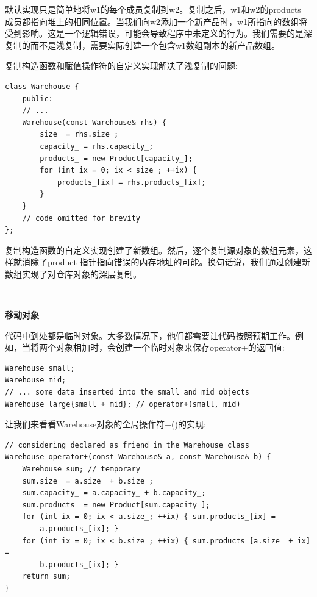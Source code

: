 默认实现只是简单地将w1的每个成员复制到w2。复制之后，w1和w2的products\underline{ }成员都指向堆上的相同位置。当我们向w2添加一个新产品时，w1所指向的数组将受到影响。这是一个逻辑错误，可能会导致程序中未定义的行为。我们需要的是深复制的而不是浅复制，需要实际创建一个包含w1数组副本的新产品数组。 \par
复制构造函数和赋值操作符的自定义实现解决了浅复制的问题: \par

\begin{lstlisting}[caption={}]
class Warehouse {
	public:
	// ...
	Warehouse(const Warehouse& rhs) {
		size_ = rhs.size_;
		capacity_ = rhs.capacity_;
		products_ = new Product[capacity_];
		for (int ix = 0; ix < size_; ++ix) {
			products_[ix] = rhs.products_[ix];
		}
	}
	// code omitted for brevity
};
\end{lstlisting}

复制构造函数的自定义实现创建了新数组。然后，逐个复制源对象的数组元素，这样就消除了product\underline{ }指针指向错误的内存地址的可能。换句话说，我们通过创建新数组实现了对仓库对象的深层复制。 \par

\noindent\textbf{}\ \par
\textbf{移动对象} \ \par
代码中到处都是临时对象。大多数情况下，他们都需要让代码按照预期工作。例如，当将两个对象相加时，会创建一个临时对象来保存operator+的返回值: \par

\begin{lstlisting}[caption={}]
Warehouse small;
Warehouse mid;
// ... some data inserted into the small and mid objects
Warehouse large{small + mid}; // operator+(small, mid)
\end{lstlisting}

让我们来看看Warehouse对象的全局操作符+()的实现: \par

\begin{lstlisting}[caption={}]
// considering declared as friend in the Warehouse class
Warehouse operator+(const Warehouse& a, const Warehouse& b) {
	Warehouse sum; // temporary
	sum.size_ = a.size_ + b.size_;
	sum.capacity_ = a.capacity_ + b.capacity_;
	sum.products_ = new Product[sum.capacity_];
	for (int ix = 0; ix < a.size_; ++ix) { sum.products_[ix] =
		a.products_[ix]; }
	for (int ix = 0; ix < b.size_; ++ix) { sum.products_[a.size_ + ix] =
		b.products_[ix]; }
	return sum;
}
\end{lstlisting}

